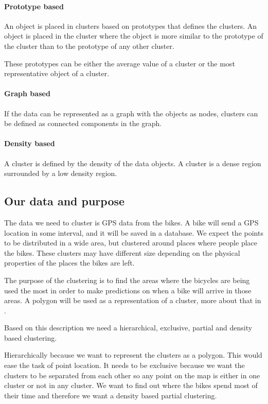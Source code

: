 \paragraph{Prototype based}
An object is placed in clusters based on prototypes that defines the clusters.
An object is placed in the cluster where the object is more similar to the prototype of the cluster than to the prototype of any other cluster.

These prototypes can be either the average value of a cluster or the most representative object of a cluster.

\paragraph{Graph based}
If the data can be represented as a graph with the objects as nodes, clusters can be defined as connected components in the graph.

\paragraph{Density based}
A cluster is defined by the density of the data objects.
A cluster is a dense region surrounded by a low density region.

\subsection{Our data and purpose}
The data we need to cluster is GPS data from the bikes.
A bike will send a GPS location in some interval, and it will be saved in a database.
We expect the points to be distributed in a wide area, but clustered around places where people place the bikes.
These clusters may have different size depending on the physical properties of the places the bikes are left.

The purpose of the clustering is to find the areas where the bicycles are being used the most in order to make predictions on when a bike will arrive in those areas.
A polygon will be used as a representation of a cluster, more about that in .

Based on this description we need a hierarchical, exclusive, partial and density based clustering.

Hierarchically because we want to represent the clusters as a polygon.
This would ease the task of point location.
It needs to be exclusive because we want the clusters to be separated from each other so any point on the map is either in one cluster or not in any cluster.
We want to find out where the bikes spend most of their time and therefore we want a density based partial clustering.

